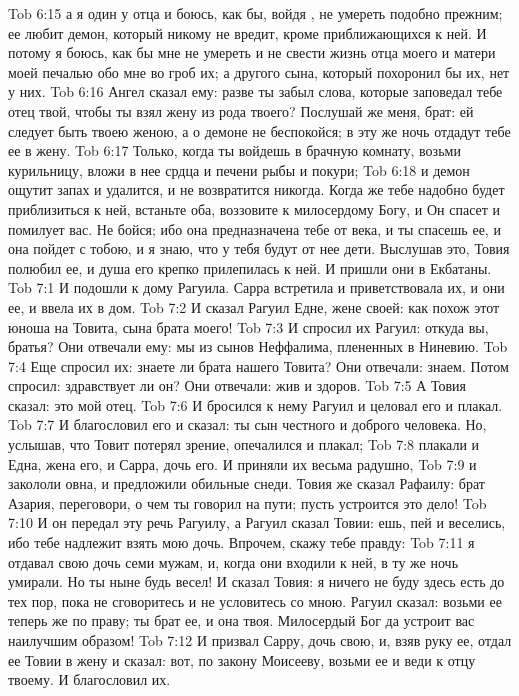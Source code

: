 \vs Tob 6:15 а я один у отца и боюсь, как бы, войдя , не умереть подобно прежним; ее любит демон, который никому не вредит, кроме приближающихся к ней. И потому я боюсь, как бы мне не умереть и не свести жизнь отца моего и матери моей печалью обо мне во гроб их; а другого сына, который похоронил бы их, нет у них.
\vs Tob 6:16 Ангел сказал ему: разве ты забыл слова, которые заповедал тебе отец твой, чтобы ты взял жену из рода твоего? Послушай же меня, брат: ей следует быть твоею женою, а о демоне не беспокойся; в эту же ночь отдадут тебе ее в жену.
\vs Tob 6:17 Только, когда ты войдешь в брачную комнату, возьми курильницу, вложи в нее срдца и печени рыбы и покури;
\vs Tob 6:18 и демон ощутит запах и удалится, и не возвратится никогда. Когда же тебе надобно будет приблизиться к ней, встаньте оба, воззовите к милосердому Богу, и Он спасет и помилует вас. Не бойся; ибо она предназначена тебе от века, и ты спасешь ее, и она пойдет с тобою, и я знаю, что у тебя будут от нее дети. Выслушав это, Товия полюбил ее, и душа его крепко прилепилась к ней. И пришли они в Екбатаны.
\vs Tob 7:1 И подошли к дому Рагуила. Сарра встретила и приветствовала их, и они ее, и ввела их в дом.
\vs Tob 7:2 И сказал Рагуил Едне, жене своей: как похож этот юноша на Товита, сына брата моего!
\vs Tob 7:3 И спросил их Рагуил: откуда вы, братья? Они отвечали ему: мы из сынов Неффалима, плененных в Ниневию.
\vs Tob 7:4 Еще спросил их: знаете ли брата нашего Товита? Они отвечали: знаем. Потом спросил: здравствует ли он? Они отвечали: жив и здоров.
\vs Tob 7:5 А Товия сказал: это мой отец.
\vs Tob 7:6 И бросился к нему Рагуил и целовал его и плакал.
\vs Tob 7:7 И благословил его и сказал: ты сын честного и доброго человека. Но, услышав, что Товит потерял зрение, опечалился и плакал;
\vs Tob 7:8 плакали и Една, жена его, и Сарра, дочь его. И приняли их весьма радушно,
\vs Tob 7:9 и закололи овна, и предложили обильные снеди. Товия же сказал Рафаилу: брат Азария, переговори, о чем ты говорил на пути; пусть устроится это дело!
\vs Tob 7:10 И он передал эту речь Рагуилу, а Рагуил сказал Товии: ешь, пей и веселись, ибо тебе надлежит взять мою дочь. Впрочем, скажу тебе правду:
\vs Tob 7:11 я отдавал свою дочь семи мужам, и, когда они входили к ней, в ту же ночь умирали. Но ты ныне будь весел! И сказал Товия: я ничего не буду здесь есть до тех пор, пока не сговоритесь и не условитесь со мною. Рагуил сказал: возьми ее теперь же по праву; ты брат ее, и она твоя. Милосердый Бог да устроит вас наилучшим образом!
\vs Tob 7:12 И призвал Сарру, дочь свою, и, взяв руку ее, отдал ее Товии в жену и сказал: вот, по закону Моисееву, возьми ее и веди к отцу твоему. И благословил их.
